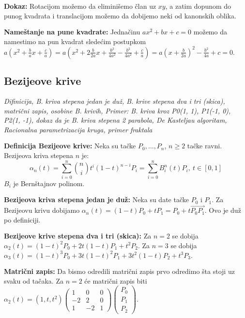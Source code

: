 \documentclass[12pt]{article}
\newcommand{\vek}[1]{\overrightarrow{#1}}
\begin{document}
\textbf{Dokaz:} Rotacijom možemo da eliminišemo član uz $xy$, a zatim dopunom
do punog kvadrata i translacijom možemo da dobijemo neki od kanonskih oblika.
\par

\textbf{Nameštanje na pune kvadrate:} Jednačinu $ax^2+bx+c=0$ možemo da
namestimo na pun kvadrat sledećim postupkom
$a(x^2+\frac{b}{a}x+\frac{c}{a})=a(x^2+2\frac{b}{2a}x+\frac{b^2}{4a^2}-\frac{b^2}{4a^2}+\frac{c}{a})
    =a(x+\frac{b}{2a})^2-\frac{b^2}{4a}+c=0$.

\subsection{Bezijeove krive}
\textit{Difinicija, B. kriva stepena jedan je duž, B. krive stepena dva i tri
    (skica), matrični zapis, osobine B. krivih, Primer: B. kriva kroz P0(1, 1),
    P1(-1, 0), P2(1, -1), dokaz da je B. kriva stepena 2 parabola, De Kasteljau
    algoritam, Racionalna parametrizacija kruga, primer fraktala}
\par
\vspace*{1cm}

\textbf{Definicija Bezijeove krive:} Neka su tačke $P_0,\dotsc,P_n$, $n\geq2$
tačke ravni. Bezijeova kriva stepena $n$ je:
$$\alpha_n(t)=\sum_{i=0}^{n}\binom{n}{i}t^i(1-t)^{n-i}P_i=\sum_{i=0}^{n}B^n_i(t)P_i,\ t\in[0,1]$$
$B_i$ je Bernštajnov polinom.
\par

\textbf{Bezijeova kriva stepena jedan je duž:} Neka su date tačke $P_0$ i $P_1$.
Za Bezijeovu krivu dobijamo $\alpha_n(t)=(1-t)P_0+tP_1=P_0+t\vek{P_0P_1}$. Ovo
je duž po definiciji.
\par

\textbf{Bezijeove krive stepena dva i tri (skica):} Za $n=2$ se dobija
$\alpha_2(t)=(1-t)^2P_0+2t(1-t)P_1+t^2P_2$. Za $n=3$ se dobija
$\alpha_3(t)=(1-t)^3P_0+3t(1-t)^2P_1+3t^2(1-t)P_2+t^3P_3$.
\par

\textbf{Matrični zapis:} Da bismo odredili matrični zapis prvo odredimo šta
stoji uz svaku od tačaka. Za $n=2$ će matrični zapis biti
$\alpha_2(t)=\left(1,t,t^2\right)\left(\begin{matrix}
            1  & 0  & 0 \\
            -2 & 2  & 0 \\
            1  & -2 & 1
        \end{matrix}\right)\left(\begin{matrix}
            P_0 \\
            P_1 \\
            P_2
        \end{matrix}\right)$.
\par
\end{document}
